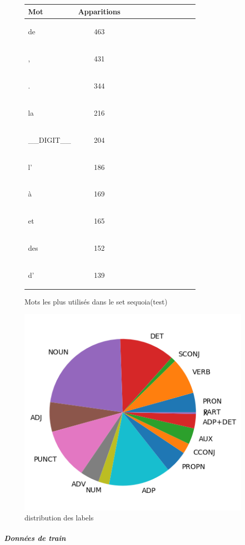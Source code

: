 \begin{figure}[H] \begin{minipage}{0.48\textwidth} \centering \begin{tabular}{|l || *{11 }{|c} |} \hline
Mot & Apparitions  \\ \hline
\begin{verb} de \end{verb} &463\\ \hline
\begin{verb} , \end{verb} &431\\ \hline
\begin{verb} . \end{verb} &344\\ \hline
\begin{verb} la \end{verb} &216\\ \hline
\begin{verb} __DIGIT__ \end{verb} &204\\ \hline
\begin{verb} l' \end{verb} &186\\ \hline
\begin{verb} à \end{verb} &169\\ \hline
\begin{verb} et \end{verb} &165\\ \hline
\begin{verb} des \end{verb} &152\\ \hline
\begin{verb} d' \end{verb} &139\\ \hline

\end{tabular}
\caption{ Mots les plus utilisés dans le set sequoia(test) } \label{Fig:muw}\end{minipage} 
\begin{minipage}{0.48\textwidth} \centering
\includegraphics[width=.7\linewidth]{sequoiatest_img.png}
\caption{distribution des labels}
\end{minipage}
\end{figure} \subparagraph{Données de train \\ }  
